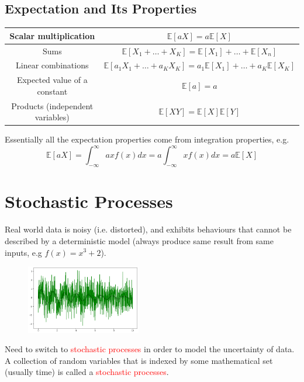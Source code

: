\documentclass[12pt,a4paper]{article}
\begin{document}
\subsection{Expectation and Its Properties}
\renewcommand{\arraystretch}{1.4}
\begin{table}[bt]
	\begin{center}
		\begin{tabular}{|c|c|} \hline
			Scalar multiplication & $\mathbb{E}[aX] = a\mathbb{E}[X]$ \\ \hline
			Sums & $\mathbb{E}[X_1+\ldots +X_K] =  \mathbb{E}[X_1] +\ldots + \mathbb{E}[X_n]$ \\ \hline
			Linear combinations & $\mathbb{E}[a_1X_1+\ldots +a_KX_K] =  a_1\mathbb{E}[X_1] +\ldots + a_K\mathbb{E}[X_K]$ \\ \hline
			Expected value of a constant & $\mathbb{E}[a] = a$ \\ \hline
			Products (independent variables) & $\mathbb{E}[XY] = \mathbb{E}[X] \mathbb{E}[Y]$ \\ \hline
		\end{tabular}
	\end{center}
\end{table}

Essentially all the expectation properties come from integration properties, e.g.
\begin{equation*}
	\mathbb{E}[aX] = \int_{-\infty}^{\infty} ax f(x) dx = a  \int_{-\infty}^{\infty} x f(x) dx = a\mathbb{E}[X]
\end{equation*}

\section{Stochastic Processes}
Real world data is noisy (i.e. distorted), and exhibits behaviours that cannot be described by a deterministic model (always produce same result from same inputs, e.g $f(x)=x^3+2$).
\begin{figure}
	\begin{center}  
	\includegraphics[height=3cm]{stochastic_process}
	\end{center}
\end{figure}
Need to switch to \textcolor{red}{stochastic processes} in order to model the uncertainty of data.  
A collection of random variables that is indexed by some mathematical set (usually time) is called a \textcolor{red}{stochastic processes}.
\end{document}
